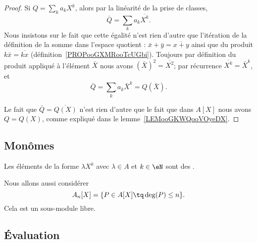 \begin{proof}
    Si \( Q=\sum_ka_kX^k\), alors par la linéarité de la prise de classes,
    \begin{equation}        \label{EQooXQRMooIPGFVM}
        \bar Q=\sum_ka_k\overline{ X^k }.
    \end{equation}
    Nous insistons sur le fait que cette égalité n'est rien d'autre que l'itération de la définition de la somme dans l'espace quotient : \( \bar x+\bar y=\overline{ x+y }\) ainsi que du produit \( k\bar x=\overline{ kx }\) (définition~\ref{PROPooGXMRooTcUGbi}). Toujours par définition du produit appliqué à l'élément \( \bar X\) nous avons \( (\bar X)^2=\overline{ X^2 }\); par récurrence \( \overline{ X^k }=\bar X^k\), et
    \begin{equation}
        \bar Q=\sum_ka_k\bar X^k=Q(\bar X).
    \end{equation}

    Le fait que \( \bar Q=\overline{ Q(X) }\) n'est rien d'autre que le fait que dans \( A[X]\) nous avons \( Q=Q(X)\), comme expliqué dans le lemme~\ref{LEMooGKWQooVOyeDX}.
\end{proof}

\subsection{Monômes}

\begin{normaltext}
Les éléments de la forme \( \lambda X^k\) avec \( \lambda\in A\) et \( k\in\eN\) sont des .

Nous allons aussi considérer
\begin{equation}
    A_n[X]=\{ P\in A[X]\tq \deg(P)\leq n \}.
\end{equation}
Cela est un sous-module libre.
\end{normaltext}

\subsection{Évaluation}

